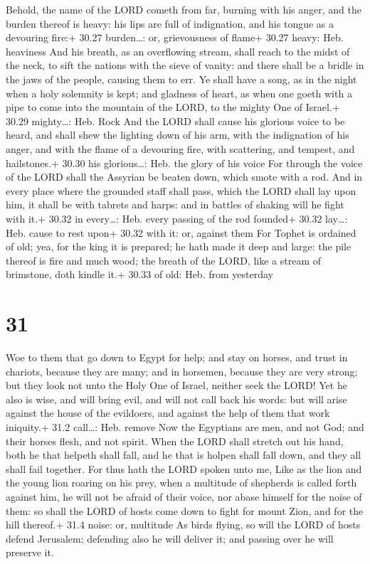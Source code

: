  Behold, the name of the LORD cometh from far, burning
with his anger, and the burden thereof is heavy: his lips are full of
indignation, and his tongue as a devouring fire:+ 30.27 burden\ldots:
or, grievousness of flame+ 30.27 heavy: Heb. heaviness  And
his breath, as an overflowing stream, shall reach to the midst of the
neck, to sift the nations with the sieve of vanity: and there shall be a
bridle in the jaws of the people, causing them to err.  Ye
shall have a song, as in the night when a holy solemnity is kept; and
gladness of heart, as when one goeth with a pipe to come into the
mountain of the LORD, to the mighty One of Israel.+ 30.29 mighty\ldots:
Heb. Rock  And the LORD shall cause his glorious voice to
be heard, and shall shew the lighting down of his arm, with the
indignation of his anger, and with the flame of a devouring fire, with
scattering, and tempest, and hailstones.+ 30.30 his glorious\ldots: Heb.
the glory of his voice  For through the voice of the LORD
shall the Assyrian be beaten down, which smote with a rod. 
And in every place where the grounded staff shall pass, which the LORD
shall lay upon him, it shall be with tabrets and harps: and in battles
of shaking will he fight with it.+ 30.32 in every\ldots: Heb. every
passing of the rod founded+ 30.32 lay\ldots: Heb. cause to rest upon+
30.32 with it: or, against them  For Tophet is ordained of
old; yea, for the king it is prepared; he hath made it deep and large:
the pile thereof is fire and much wood; the breath of the LORD, like a
stream of brimstone, doth kindle it.+ 30.33 of old: Heb. from yesterday

\hypertarget{section-30}{%
\section{31}\label{section-30}}

 Woe to them that go down to Egypt for help; and stay on
horses, and trust in chariots, because they are many; and in horsemen,
because they are very strong; but they look not unto the Holy One of
Israel, neither seek the LORD!  Yet he also is wise, and
will bring evil, and will not call back his words: but will arise
against the house of the evildoers, and against the help of them that
work iniquity.+ 31.2 call\ldots: Heb. remove  Now the
Egyptians are men, and not God; and their horses flesh, and not spirit.
When the LORD shall stretch out his hand, both he that helpeth shall
fall, and he that is holpen shall fall down, and they all shall fail
together.  For thus hath the LORD spoken unto me, Like as
the lion and the young lion roaring on his prey, when a multitude of
shepherds is called forth against him, he will not be afraid of their
voice, nor abase himself for the noise of them: so shall the LORD of
hosts come down to fight for mount Zion, and for the hill thereof.+ 31.4
noise: or, multitude  As birds flying, so will the LORD of
hosts defend Jerusalem; defending also he will deliver it; and passing
over he will preserve it.

